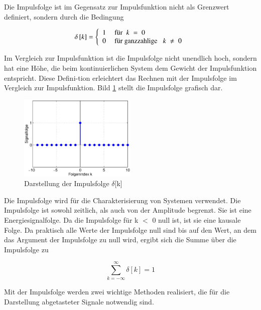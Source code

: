 \noindent Die Impulsfolge ist im Gegensatz zur Impulsfunktion nicht als Grenzwert definiert, sondern durch die Bedingung

\begin{equation}\label{eq:threeeighteen}
\delta \left[k\right]=\left\{\begin{array}{l} {
1\quad \text{ für } \; k\; =\; 0} \\ 
{0\quad \text{ für ganzzahlige }\; \; k\; \ne \rm \; 0} \end{array}\right.
\end{equation}

\noindent Im Vergleich zur Impulsfunktion ist die Impulsfolge nicht unendlich hoch, sondern hat eine Höhe, die beim kontinuierlichen System dem Gewicht der Impulsfunktion entspricht. Diese Defini-tion erleichtert das Rechnen mit der Impulsfolge im Vergleich zur Impulsfunktion. Bild \ref{fig:ImpulsFunktion} stellt die Impulsfolge grafisch dar.

\begin{figure}[H]
  \centerline{\includegraphics[width=0.5\textwidth]{Kapitel3/Bilder/image7.eps}}
  \caption{Darstellung der Impulsfolge $\delta$[k]}
  \label{fig:ImpulsFunktion}
\end{figure}

\noindent Die Impulsfolge wird f\"{u}r die Charakterisierung von Systemen verwendet. Die Impulsfolge ist sowohl zeitlich, als auch von der Amplitude begrenzt. Sie ist eine Energiesignalfolge. Da die Impulsfolge f\"{u}r k $\mathrm{<}$ 0 null ist, ist sie eine kausale Folge. Da praktisch alle Werte der Impulsfolge null sind bis auf den Wert, an dem das Argument der Impulsfolge zu null wird, ergibt sich die Summe \"{u}ber die Impulsfolge zu

\begin{equation}\label{eq:threenineteen}
\sum _{k=-\infty }^{\infty }\delta \left[k\right] =1
\end{equation}

\noindent Mit der Impulsfolge werden zwei wichtige Methoden realisiert, die f\"{u}r die Darstellung abgetasteter Signale notwendig sind. 

